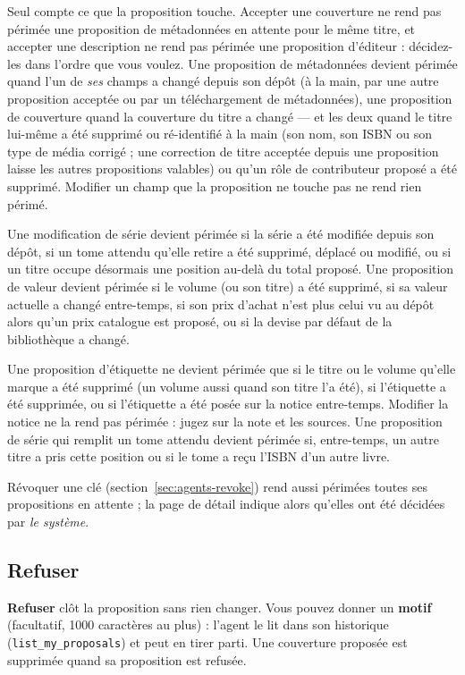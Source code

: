 Seul compte ce que la proposition touche. Accepter une couverture ne
rend pas périmée une proposition de métadonnées en attente pour le
même titre, et accepter une description ne rend pas périmée une
proposition d'éditeur : décidez-les dans l'ordre que vous voulez. Une
proposition de métadonnées devient périmée quand l'un de \emph{ses}
champs a changé depuis son dépôt (à la main, par une autre proposition
acceptée ou par un téléchargement de métadonnées), une proposition de
couverture quand la couverture du titre a changé --- et les deux quand
le titre lui-même a été supprimé ou ré-identifié à la main (son nom,
son ISBN ou son type de média corrigé ; une correction de titre acceptée
depuis une proposition laisse les autres propositions valables) ou qu'un rôle de contributeur proposé a été
supprimé. Modifier un champ que la proposition ne touche pas ne rend
rien périmé.

Une modification de série devient périmée si la série a été modifiée
depuis son dépôt, si un tome attendu qu'elle retire a été supprimé,
déplacé ou modifié, ou si un titre occupe désormais une position
au-delà du total proposé. Une proposition de valeur devient périmée si
le volume (ou son titre) a été supprimé, si sa valeur actuelle a changé
entre-temps, si son prix d'achat n'est plus celui vu au dépôt alors
qu'un prix catalogue est proposé, ou si la devise par défaut de la bibliothèque a changé.

Une proposition d'étiquette ne devient périmée que si le titre ou le
volume qu'elle marque a été supprimé (un volume aussi quand son titre
l'a été), si l'étiquette a été supprimée, ou si l'étiquette a été posée
sur la notice entre-temps. Modifier la notice ne la rend pas périmée :
jugez sur la note et les sources. Une proposition de série qui remplit
un tome attendu devient périmée si, entre-temps, un autre titre a pris
cette position ou si le tome a reçu l'ISBN d'un autre livre.

Révoquer une clé (section~\ref{sec:agents-revoke}) rend aussi
périmées toutes ses propositions en attente ; la page de détail
indique alors qu'elles ont été décidées par \emph{le système}.

\subsection{Refuser}

\textbf{Refuser} clôt la proposition sans rien changer. Vous pouvez
donner un \textbf{motif} (facultatif, 1000 caractères au plus) :
l'agent le lit dans son historique (\texttt{list\_my\_proposals}) et
peut en tirer parti. Une couverture proposée est supprimée quand sa
proposition est refusée.

